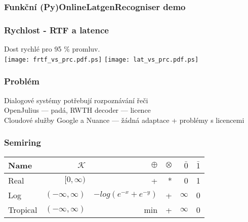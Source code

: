 \begin{frame}\frametitle{Funkční (Py)OnlineLatgenRecogniser demo} 
    \begin{center}
        
    \end{center}
\end{frame}

\begin{frame}\frametitle{Rychlost - RTF a latence} 
    Dost rychlé pro 95 \% promluv. \\
    \texttt{[image: frtf\_vs\_prc.pdf.ps]}
    \texttt{[image: lat\_vs\_prc.pdf.ps]}
\end{frame}


\begin{frame}\frametitle{Problém} 
    Dialogové systémy potřebují rozpoznávání řeči \\
    OpenJulius --- padá, RWTH decoder --- licence \\
    Cloudové služby Google a Nuance --- žádná adaptace + problémy s licencemi 
\end{frame}

\begin{frame} \frametitle{Semiring}
\begin{tabular}{lrrrrr}
\hline
Name & $\mathcal{K}$ & $\oplus$ & $ \otimes$ & $\bar{0}$ & $\bar{1}$ \\ 
\hline
Real        & $[0,\infty)$        &  +                     &  * &  0        &  1  \\
Log         & $(-\infty, \infty)$ & $-log(e^{-x} + e^{-y})$ & + &  $\infty$ &  0  \\
Tropical    & $(-\infty, \infty)$ &  min                   &  + &  $\infty$ &  0  \\
\hline
\end{tabular}
\end{frame}

